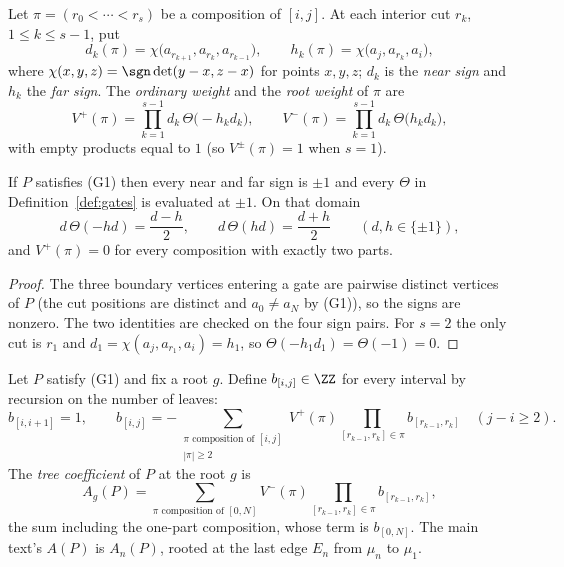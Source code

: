 \begin{definition}[gates]\label{def:gates}\leanok
Let $\pi=(r_0<\cdots<r_s)$ be a composition of $[i,j]$. At each interior cut
$r_k$, $1\leq k\leq s-1$, put
\[
d_k(\pi)=\chi\bigl(a_{r_{k+1}},a_{r_k},a_{r_{k-1}}\bigr),\qquad
h_k(\pi)=\chi\bigl(a_j,a_{r_k},a_i\bigr),
\]
where $\chi(x,y,z)=\sgn\det(y-x,z-x)$ for points $x,y,z$; $d_k$ is the
\emph{near sign} and $h_k$ the \emph{far sign}. The \emph{ordinary weight}
and the \emph{root weight} of $\pi$ are
\[
V^+(\pi)=\prod_{k=1}^{s-1}d_k\,\Theta\bigl(-h_kd_k\bigr),\qquad
V^-(\pi)=\prod_{k=1}^{s-1}d_k\,\Theta\bigl(h_kd_k\bigr),
\]
with empty products equal to $1$ (so $V^\pm(\pi)=1$ when $s=1$).
\end{definition}

\begin{lemma}\label{lem:gates-nonzero}\leanok
If $P$ satisfies (G1) then every near and far sign is $\pm1$ and every
$\Theta$ in Definition~\ref{def:gates} is evaluated at $\pm1$. On that
domain
\[
d\,\Theta(-hd)=\frac{d-h}{2},\qquad d\,\Theta(hd)=\frac{d+h}{2}\qquad(d,h\in\{\pm1\}),
\]
and $V^+(\pi)=0$ for every composition with exactly two parts.

\end{lemma}
\begin{proof}\leanok{}
The three boundary vertices entering a gate are pairwise distinct vertices of
$P$ (the cut positions are distinct and $a_0\neq a_N$ by (G1)), so the signs
are nonzero. The two identities are checked on the four sign pairs. For
$s=2$ the only cut is $r_1$ and $d_1=\chi(a_j,a_{r_1},a_i)=h_1$, so
$\Theta(-h_1d_1)=\Theta(-1)=0$.
\end{proof}

\begin{definition}\label{def:treesum}\leanok
Let $P$ satisfy (G1) and fix a root $g$. Define $b_{[i,j]}\in\ZZ$ for every
interval by recursion on the number of leaves:
\[
b_{[i,i+1]}=1,\qquad
b_{[i,j]}=-\sum_{\substack{\pi\text{ composition of }[i,j]\\|\pi|\geq2}}
V^+(\pi)\prod_{[r_{k-1},r_k]\in\pi}b_{[r_{k-1},r_k]}\quad(j-i\geq2).
\]
The \emph{tree coefficient} of $P$ at the root $g$ is
\[
A_g(P)=\sum_{\pi\text{ composition of }[0,N]}
V^-(\pi)\prod_{[r_{k-1},r_k]\in\pi}b_{[r_{k-1},r_k]},
\]
the sum including the one-part composition, whose term is $b_{[0,N]}$. The main
text's $A(P)$ is $A_n(P)$, rooted at the last edge $E_n$ from $\mu_n$ to
$\mu_1$.
\end{definition}

